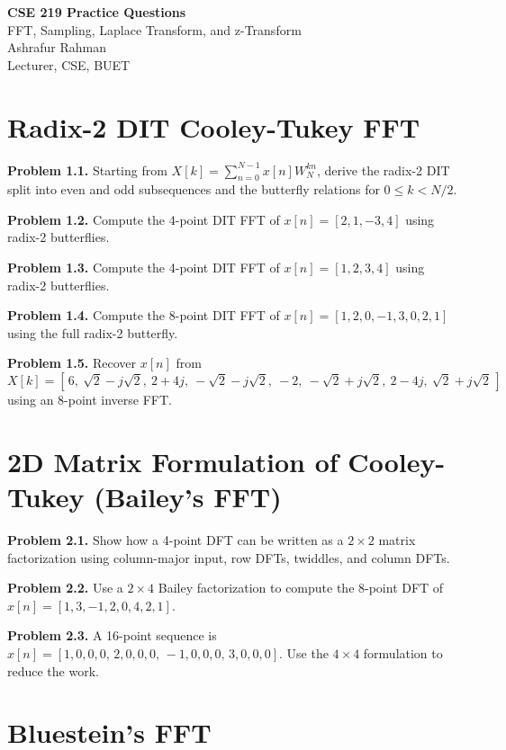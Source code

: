 \documentclass[10pt]{article}
\newcommand{\QuestionItem}[2]{\par\medskip\textbf{#1.} #2\par}
\begin{document}
\begin{center}
  {\LARGE \textbf{CSE 219 Practice Questions}}\\[0.24em]
  {\large FFT, Sampling, Laplace Transform, and z-Transform}\\[1em]
  {\normalfont Ashrafur Rahman\\ Lecturer, CSE, BUET}
\end{center}

\tableofcontents
\newpage

\section{Radix-2 DIT Cooley-Tukey FFT}

\QuestionItem{Problem 1.1}{Starting from \(X[k]=\sum_{n=0}^{N-1}x[n]W_N^{kn}\), derive the radix-2 DIT split into even and odd subsequences and the butterfly relations for \(0\le k<N/2\).}

\QuestionItem{Problem 1.2}{Compute the 4-point DIT FFT of \(x[n]=[2,1,-3,4]\) using radix-2 butterflies.}

\QuestionItem{Problem 1.3}{Compute the 4-point DIT FFT of \(x[n]=[1,2,3,4]\) using radix-2 butterflies.}

\QuestionItem{Problem 1.4}{Compute the 8-point DIT FFT of \(x[n]=[1,2,0,-1,3,0,2,1]\) using the full radix-2 butterfly.}

\QuestionItem{Problem 1.5}{Recover \(x[n]\) from
  \[
    X[k]=[\,6,\ \sqrt2-j\sqrt2,\ 2+4j,\ -\sqrt2-j\sqrt2,\ -2,\ -\sqrt2+j\sqrt2,\ 2-4j,\ \sqrt2+j\sqrt2\,]
  \]
using an 8-point inverse FFT.}

\section{2D Matrix Formulation of Cooley-Tukey (Bailey's FFT)}

\QuestionItem{Problem 2.1}{Show how a 4-point DFT can be written as a \(2\times 2\) matrix factorization using column-major input, row DFTs, twiddles, and column DFTs.}

\QuestionItem{Problem 2.2}{Use a \(2\times 4\) Bailey factorization to compute the 8-point DFT of \(x[n]=[1,3,-1,2,0,4,2,1]\).}

\QuestionItem{Problem 2.3}{A 16-point sequence is \(x[n]=[1,0,0,0,\,2,0,0,0,\,-1,0,0,0,\,3,0,0,0]\). Use the \(4\times 4\) formulation to reduce the work.}

\section{Bluestein's FFT}
\end{document}
